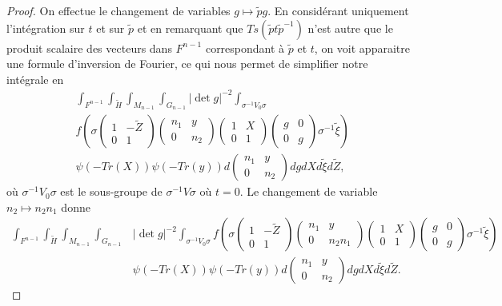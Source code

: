 \documentclass{amsart}
\begin{document}
\begin{proof}
On effectue le changement de variables $g \mapsto \tilde{p}g$. En considérant uniquement l'intégration sur $t$ et sur $\tilde{p}$ et en remarquant que $Ts(\tilde{p}t\tilde{p}^{-1})$ n'est autre que le produit scalaire des vecteurs dans $F^{n-1}$ correspondant à $\tilde{p}$ et $t$, on voit apparaitre une
formule d'inversion de Fourier, ce qui nous permet de simplifier notre intégrale en
\begin{equation}
\begin{split}
& \int_{F^{n-1}} \int_{\tilde{H}} \int_{M_{n-1}} \int_{G_{n-1}}  |\det g|^{-2}\int_{\sigma^{-1}V_0\sigma} \\
& f\left(\sigma \begin{pmatrix}
1 & -\tilde{Z} \\
0 & 1
\end{pmatrix}  \begin{pmatrix}
n_1 & y \\
0 & n_2
\end{pmatrix} \begin{pmatrix}
1 & X \\
0 & 1
\end{pmatrix} \begin{pmatrix}
g & 0 \\
0 & g
\end{pmatrix} \sigma^{-1} \tilde{\xi}\right) \\
& \psi(-Tr(X)) \psi(-Tr(y))  d\begin{pmatrix}
n_1 & y \\
0 & n_2
\end{pmatrix} dg dX d\tilde{\xi} d\tilde{Z},
\end{split}
\end{equation}
où $\sigma^{-1}V_0\sigma$ est le sous-groupe de $\sigma^{-1}V\sigma$ où $t=0$. Le changement de variable $n_2 \mapsto n_2n_1$ donne
\begin{equation}
\begin{split}
\int_{F^{n-1}} \int_{\tilde{H}} \int_{M_{n-1}} \int_{G_{n-1}}  &|\det g|^{-2}\int_{\sigma^{-1}V_0\sigma} f\left(\sigma \begin{pmatrix}
1 & -\tilde{Z} \\
0 & 1
\end{pmatrix}  \begin{pmatrix}
n_1 & y \\
0 & n_2n_1
\end{pmatrix} \begin{pmatrix}
1 & X \\
0 & 1
\end{pmatrix} \begin{pmatrix}
g & 0 \\
0 & g
\end{pmatrix} \sigma^{-1} \tilde{\xi}\right) \\
& \psi(-Tr(X)) \psi(-Tr(y))  d\begin{pmatrix}
n_1 & y \\
0 & n_2
\end{pmatrix} dg dX d\tilde{\xi} d\tilde{Z}.
\end{split}
\end{equation}


\end{proof}
\end{document}
